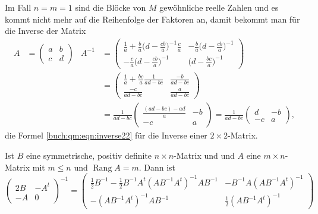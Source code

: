 \begin{beispiel}
Im Fall $n=m=1$ sind die Blöcke von $M$ gewöhnliche reelle Zahlen und es
kommt nicht mehr auf die Reihenfolge der Faktoren an, damit bekommt man
für die Inverse der Matrix
\begin{align*}
A&=\begin{pmatrix}a&b\\c&d\end{pmatrix}
&
A^{-1}
&=
\begin{pmatrix}
\displaystyle \frac1a + \frac{b}a\biggl(d-\frac{cb}a\biggr)^{-1}\frac{c}a
	&\displaystyle -\frac{b}a \biggl(d-\frac{cb}{a}\biggr)^{-1}
\\[10pt]
\displaystyle -\frac{c}a\biggl(d-\frac{cb}{a}\biggr)^{-1}
	&\displaystyle \biggl(d-\frac{bc}{a}\biggr)^{-1}
\end{pmatrix}
\\
&&&=
\begin{pmatrix}
\displaystyle \frac1a + \frac{bc}{a}\frac{1}{ad-bc}
	&\displaystyle \frac{-b}{ad-bc}
\\[10pt]
\displaystyle \frac{-c}{ad-bc}
	&\displaystyle \frac{a}{ad-bc}
\end{pmatrix}
\\
&&&=
\frac{1}{ad-bc}
\begin{pmatrix}
\displaystyle \frac{(ad-bc)-ad}a&-b\\
-c&a
\end{pmatrix}
=
\frac{1}{ad-bc}
\begin{pmatrix}
 d&-b\\
-c& a
\end{pmatrix},
\end{align*}
die Formel \eqref{buch:qm:eqn:inverse22}
für die Inverse einer $2\times 2$-Matrix.
\end{beispiel}

\begin{korollar}
\label{buch:qm:korollar:quadr}
Ist $B$ eine symmetrische, positiv definite $n\times n$-Matrix und 
und $A$ eine $m\times n$-Matrix mit $m\le n$ und $\operatorname{Rang}A=m$.
Dann ist 
\begin{equation}
\begin{pmatrix}
2B&-A^t \\
-A & 0
\end{pmatrix}^{-1}
=
\begin{pmatrix}
\frac12B^{-1} - \frac12B^{-1}A^t(AB^{-1}A^t)^{-1}AB^{-1}
      & -B^{-1}A(AB^{-1}A^t)^{-1} \\
-(AB^{-1}A^t)^{-1}AB^{-1} & \frac12 (AB^{-1}A^t)^{-1}
\end{pmatrix}
\label{buch:qm:eqn:quadr}
\end{equation}
\end{korollar}

